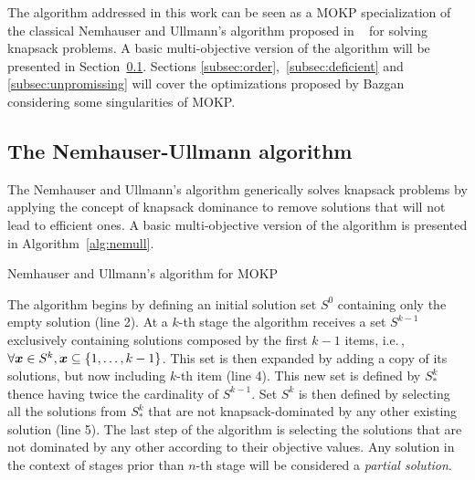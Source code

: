 
The algorithm addressed in this work
can be seen as a MOKP specialization of the classical Nemhauser
and Ullmann's algorithm proposed in ~\cite{nemhauser1969discrete}
for solving knapsack problems.
A basic multi-objective version of the algorithm will be
presented in Section~\ref{subsec:nu}.
Sections \ref{subsec:order},~\ref{subsec:deficient} and \ref{subsec:unpromissing}
will cover the optimizations proposed by Bazgan considering some singularities
of MOKP.


\subsection{The Nemhauser-Ullmann algorithm}
\label{subsec:nu}

The Nemhauser and Ullmann's algorithm generically solves knapsack problems
by applying the concept of knapsack dominance to remove solutions that will
not lead to efficient ones.
A basic multi-objective version of the algorithm is presented in Algorithm~\ref{alg:nemull}.

\begin{algorithm}
  \caption{Nemhauser and Ullmann's algorithm for MOKP}
  \label{alg:nemull}
  
\end{algorithm}

The algorithm begins by defining an initial solution set $S^0$ containing only
the empty solution (line 2).
At a $k$-th stage the algorithm receives a set $S^{k-1}$
exclusively containing solutions composed by the first ${k-1}$ items, i.e.\,,
$\forall\boldsymbol{x} \in S^k, \boldsymbol{x} \subseteq \{1, \ldots, k-1\}$.
This set is then expanded by adding a copy of its solutions,
but now including $k$-th item (line 4).
This new set is defined by $S^k_*$ thence having twice the cardinality of $S^{k-1}$.
Set $S^k$ is then defined by selecting all the solutions from $S^k_*$
that are not knapsack-dominated by any other existing solution (line 5).
The last step of the algorithm is selecting the solutions that are
not dominated by any other according to their objective values.
Any solution in the context of stages prior than $n$-th stage
will be considered a \emph{partial solution}.

